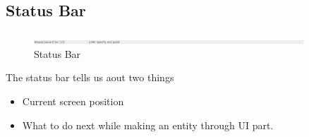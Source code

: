 \subsection{Status Bar}
\begin{figure}[h!]
\centering
\includegraphics[width=0.9\textwidth]{images/statusbar.png} 
\caption{Status Bar}
\end{figure}
The status bar tells us aout two things
\begin{itemize}
\item Current screen position
\item What to do next while making an entity through UI part.
\end{itemize}